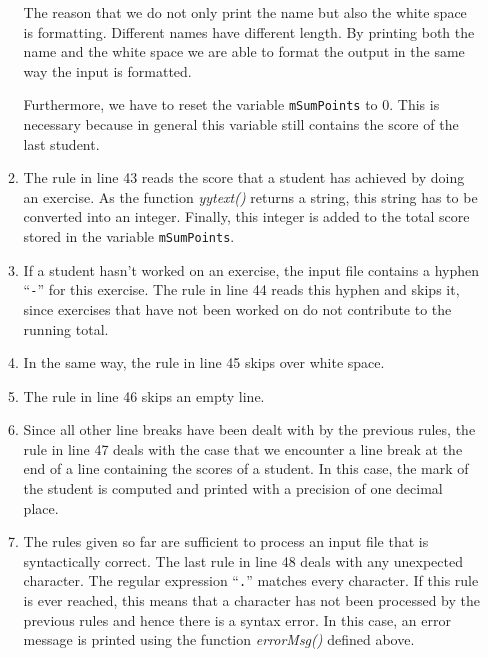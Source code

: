 \begin{enumerate}
\begin{enumerate}
            The reason that we do not only print the name but also the white space is formatting.
            Different names have different length.  By printing both the name and the white space we
            are able to format the output in the same way the input is formatted. 

            Furthermore, we have to reset the variable \texttt{mSumPoints} to 0.  This is necessary
            because in general this variable still contains the score of the last student.
      \item The rule in line 43 reads the score that a student has achieved by doing an exercise.
            As the function \textsl{yytext()} returns a string, this string has to be converted into
            an integer.  Finally, this integer is added to the total score stored in the variable
            \texttt{mSumPoints}. 
      \item If a student hasn't worked on an exercise, the input file contains a hyphen 
            ``\texttt{-}'' for this exercise.  The rule in line 44 reads this hyphen and skips it,
            since exercises that have not been worked on do not contribute to the running total.
      \item In the same way, the rule in line 45 skips over white space.
      \item The rule in line 46 skips an empty line.
      \item Since all other line breaks have been dealt with by the previous rules, the rule in line
            47 deals with the case that we encounter a line break at the end of a 
            line containing the scores of a student.  In this case, the mark of the student is
            computed and printed with a precision of one decimal place.
      \item The rules given so far are sufficient to process an input file that is syntactically
            correct.  The last rule in line 48 deals with any unexpected character.  The regular
            expression ``\texttt{.}'' matches every character.  If this rule is ever reached, this
            means that a character has not been processed by the previous rules and hence there is a
            syntax error.  In this case, an error message is printed using the function
            \textsl{errorMsg()} defined above.
      \end{enumerate}
\end{enumerate}

